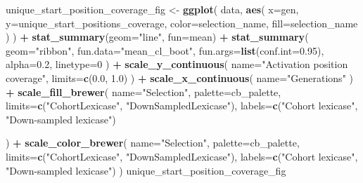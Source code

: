 \documentclass[]{book}
\newenvironment{Shaded}{\begin{snugshade}}{\end{snugshade}}
\newcommand{\DataTypeTok}[1]{\textcolor[rgb]{0.13,0.29,0.53}{#1}}
\newcommand{\DecValTok}[1]{\textcolor[rgb]{0.00,0.00,0.81}{#1}}
\newcommand{\FloatTok}[1]{\textcolor[rgb]{0.00,0.00,0.81}{#1}}
\newcommand{\KeywordTok}[1]{\textcolor[rgb]{0.13,0.29,0.53}{\textbf{#1}}}
\newcommand{\NormalTok}[1]{#1}
\newcommand{\OperatorTok}[1]{\textcolor[rgb]{0.81,0.36,0.00}{\textbf{#1}}}
\newcommand{\StringTok}[1]{\textcolor[rgb]{0.31,0.60,0.02}{#1}}
\begin{document}
\begin{Shaded}
\begin{Highlighting}[]
\NormalTok{unique_start_position_coverage_fig <-}\StringTok{ }\KeywordTok{ggplot}\NormalTok{(}
\NormalTok{    data,}
    \KeywordTok{aes}\NormalTok{(}
      \DataTypeTok{x=}\NormalTok{gen,}
      \DataTypeTok{y=}\NormalTok{unique_start_positions_coverage,}
      \DataTypeTok{color=}\NormalTok{selection_name,}
      \DataTypeTok{fill=}\NormalTok{selection_name}
\NormalTok{    )}
\NormalTok{  ) }\OperatorTok{+}
\StringTok{  }\KeywordTok{stat_summary}\NormalTok{(}\DataTypeTok{geom=}\StringTok{"line"}\NormalTok{, }\DataTypeTok{fun=}\NormalTok{mean) }\OperatorTok{+}
\StringTok{  }\KeywordTok{stat_summary}\NormalTok{(}
    \DataTypeTok{geom=}\StringTok{"ribbon"}\NormalTok{,}
    \DataTypeTok{fun.data=}\StringTok{"mean_cl_boot"}\NormalTok{,}
    \DataTypeTok{fun.args=}\KeywordTok{list}\NormalTok{(}\DataTypeTok{conf.int=}\FloatTok{0.95}\NormalTok{),}
    \DataTypeTok{alpha=}\FloatTok{0.2}\NormalTok{,}
    \DataTypeTok{linetype=}\DecValTok{0}
\NormalTok{  ) }\OperatorTok{+}
\StringTok{  }\KeywordTok{scale_y_continuous}\NormalTok{(}
    \DataTypeTok{name=}\StringTok{"Activation position coverage"}\NormalTok{,}
    \DataTypeTok{limits=}\KeywordTok{c}\NormalTok{(}\FloatTok{0.0}\NormalTok{, }\FloatTok{1.0}\NormalTok{)}
\NormalTok{  ) }\OperatorTok{+}
\StringTok{  }\KeywordTok{scale_x_continuous}\NormalTok{(}
    \DataTypeTok{name=}\StringTok{"Generations"}
\NormalTok{  ) }\OperatorTok{+}
\StringTok{  }\KeywordTok{scale_fill_brewer}\NormalTok{(}
    \DataTypeTok{name=}\StringTok{"Selection"}\NormalTok{,}
    \DataTypeTok{palette=}\NormalTok{cb_palette,}
    \DataTypeTok{limits=}\KeywordTok{c}\NormalTok{(}\StringTok{"CohortLexicase"}\NormalTok{, }\StringTok{"DownSampledLexicase"}\NormalTok{),}
    \DataTypeTok{labels=}\KeywordTok{c}\NormalTok{(}\StringTok{"Cohort lexicase"}\NormalTok{, }\StringTok{"Down-sampled lexicase"}\NormalTok{)}

\NormalTok{  ) }\OperatorTok{+}
\StringTok{  }\KeywordTok{scale_color_brewer}\NormalTok{(}
    \DataTypeTok{name=}\StringTok{"Selection"}\NormalTok{,}
    \DataTypeTok{palette=}\NormalTok{cb_palette,}
    \DataTypeTok{limits=}\KeywordTok{c}\NormalTok{(}\StringTok{"CohortLexicase"}\NormalTok{, }\StringTok{"DownSampledLexicase"}\NormalTok{),}
    \DataTypeTok{labels=}\KeywordTok{c}\NormalTok{(}\StringTok{"Cohort lexicase"}\NormalTok{, }\StringTok{"Down-sampled lexicase"}\NormalTok{)}
\NormalTok{  )}
\NormalTok{unique_start_position_coverage_fig}
\end{Highlighting}
\end{Shaded}
\end{document}
